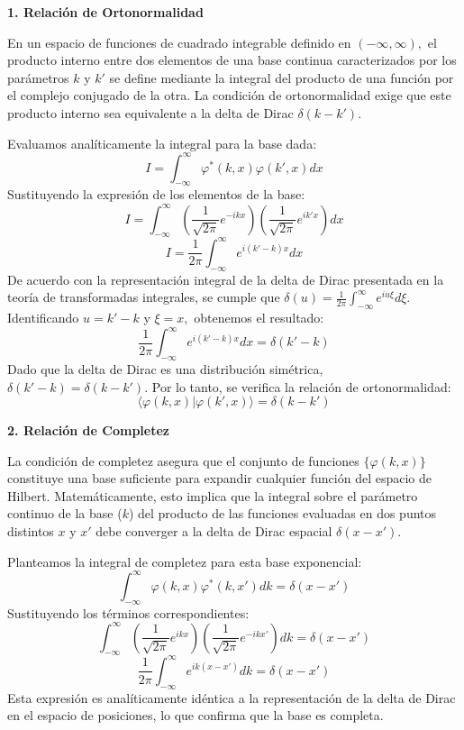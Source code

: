 \documentclass[a4paper]{article}
\begin{document}
\textbf{1. Relación de Ortonormalidad}

En un espacio de funciones de cuadrado integrable definido en $(-\infty, \infty),$ el producto interno entre dos elementos de una base continua caracterizados por los parámetros $k$ y $k'$ se define mediante la integral del producto de una función por el complejo conjugado de la otra. La condición de ortonormalidad exige que este producto interno sea equivalente a la delta de Dirac $\delta(k - k')$.

Evaluamos analíticamente la integral para la base dada:
$$ I = \int_{-\infty}^{\infty} \varphi^*(k, x) \varphi(k', x) dx $$
Sustituyendo la expresión de los elementos de la base:
$$ I = \int_{-\infty}^{\infty} \left( \frac{1}{\sqrt{2\pi}} e^{-ikx} \right) \left( \frac{1}{\sqrt{2\pi}} e^{ik'x} \right) dx $$
$$ I = \frac{1}{2\pi} \int_{-\infty}^{\infty} e^{i(k' - k)x} dx $$
De acuerdo con la representación integral de la delta de Dirac presentada en la teoría de transformadas integrales, se cumple que $\delta(u) = \frac{1}{2\pi} \int_{-\infty}^{\infty} e^{iu\xi} d\xi$. Identificando $u = k' - k$ y $\xi = x,$ obtenemos el resultado:
$$ \frac{1}{2\pi} \int_{-\infty}^{\infty} e^{i(k' - k)x} dx = \delta(k' - k) $$
Dado que la delta de Dirac es una distribución simétrica, $\delta(k' - k) = \delta(k - k')$. Por lo tanto, se verifica la relación de ortonormalidad:
$$ \langle \varphi(k, x) | \varphi(k', x) \rangle = \delta(k - k') $$

\textbf{2. Relación de Completez}

La condición de completez asegura que el conjunto de funciones $\{\varphi(k, x)\}$ constituye una base suficiente para expandir cualquier función del espacio de Hilbert. Matemáticamente, esto implica que la integral sobre el parámetro continuo de la base ($k$) del producto de las funciones evaluadas en dos puntos distintos $x$ y $x'$ debe converger a la delta de Dirac espacial $\delta(x - x')$.

Planteamos la integral de completez para esta base exponencial:
$$ \int_{-\infty}^{\infty} \varphi(k, x) \varphi^*(k, x') dk = \delta(x - x') $$
Sustituyendo los términos correspondientes:
$$ \int_{-\infty}^{\infty} \left( \frac{1}{\sqrt{2\pi}} e^{ikx} \right) \left( \frac{1}{\sqrt{2\pi}} e^{-ikx'} \right) dk = \delta(x - x') $$
$$ \frac{1}{2\pi} \int_{-\infty}^{\infty} e^{ik(x - x')} dk = \delta(x - x') $$
Esta expresión es analíticamente idéntica a la representación de la delta de Dirac en el espacio de posiciones, lo que confirma que la base es completa.
\end{document}
